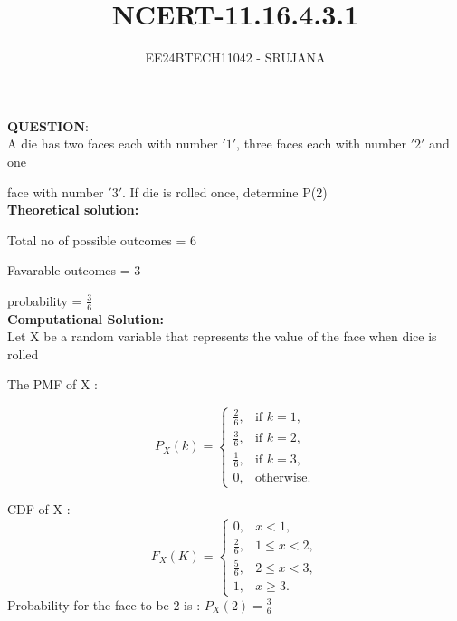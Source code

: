 \documentclass[journal]{IEEEtran}
\begin{document}

\vspace{3cm}

\title{NCERT-11.16.4.3.1}
\author{EE24BTECH11042 - SRUJANA}
{\let\newpage\relax\maketitle}

\renewcommand{\thefigure}{\theenumi}
\renewcommand{\thetable}{\theenumi}
\setlength{\intextsep}{10pt} 

\renewcommand{\thetable}{\theenumi}

\textbf{QUESTION}:\\

A die has two faces each with number $'1'$, three faces each with number $'2'$ and one 

face with number $'3'$. If die is rolled once, determine P(2)\\


\textbf{Theoretical solution: }

Total no of possible outcomes = 6 

Favarable outcomes = 3

probability = $\frac{3}{6}$\\

\textbf{Computational Solution:}\\

Let X be a random variable that represents the value of the face when dice is rolled

The PMF of X :

\[
P_X(k) =
\begin{cases}
    \frac{2}{6}, & \text{if } k = 1, \\
    \frac{3}{6}, & \text{if } k = 2, \\
    \frac{1}{6}, & \text{if } k = 3, \\
    0, & \text{otherwise}.
\end{cases}
\]

CDF of X : 
\[
F_X(K) =
\begin{cases}
    0, & x < 1, \\
    \frac{2}{6}, & 1 \leq x < 2, \\
    \frac{5}{6}, & 2 \leq x < 3, \\
    1, & x \geq 3.
\end{cases}
\]
Probability for the face to be 2 is :
$P_X(2) = \frac{3}{6}$\\
\end{document}
